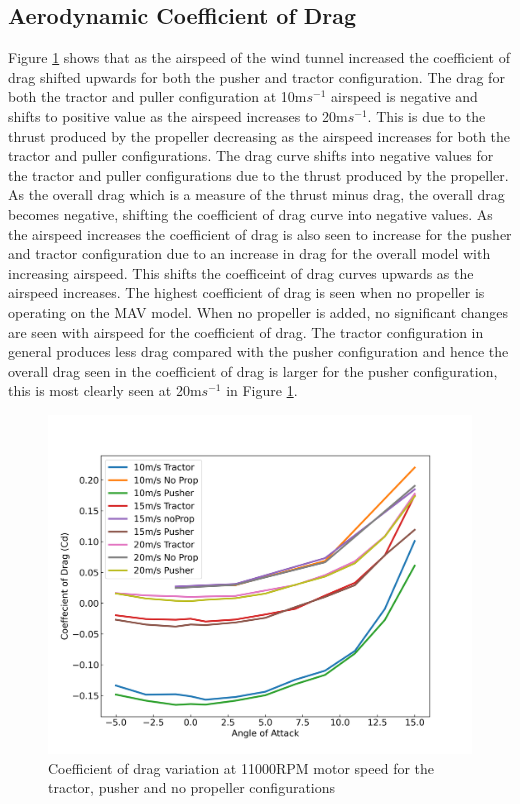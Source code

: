 \subsection{Aerodynamic Coefficient of Drag}
Figure \ref{fig:Cd_11000RPM} shows that as the airspeed of the wind tunnel increased the coefficient of drag shifted upwards for both the pusher and tractor configuration. The drag for both the tractor and puller configuration at 10m$s^{-1}$ airspeed is negative and shifts to positive value as the airspeed increases to 20m$s^{-1}$. This is due to the thrust produced by the propeller decreasing as the airspeed increases for both the tractor and puller configurations. The drag curve shifts into negative values for the tractor and puller configurations due to the thrust produced by the propeller. As the overall drag which is a measure of the thrust minus drag, the overall drag becomes negative, shifting the coefficient of drag curve into negative values. As the airspeed increases the coefficient of drag is also seen to increase for the pusher and tractor configuration due to an increase in drag for the overall model with increasing airspeed. This shifts the coefficeint of drag curves upwards as the airspeed increases.  The highest coefficient of drag is seen when no propeller is operating on the MAV model. When no propeller is added, no significant changes are seen with airspeed for the coefficient of drag. The tractor configuration in general produces less drag compared with the pusher configuration and hence the overall drag seen in the coefficient of drag is larger for the pusher configuration, this is most clearly seen at 20m$s^{-1}$ in Figure \ref{fig:Cd_11000RPM}. 

\begin{figure}[H]
    \centering
    \includegraphics[scale = 0.7]{05_Results/Figs/Cd/110000RPM_Cd.png}
    \caption{Coefficient of drag variation at 11000RPM motor speed for the tractor, pusher and no propeller configurations}
    \label{fig:Cd_11000RPM}
\end{figure}


